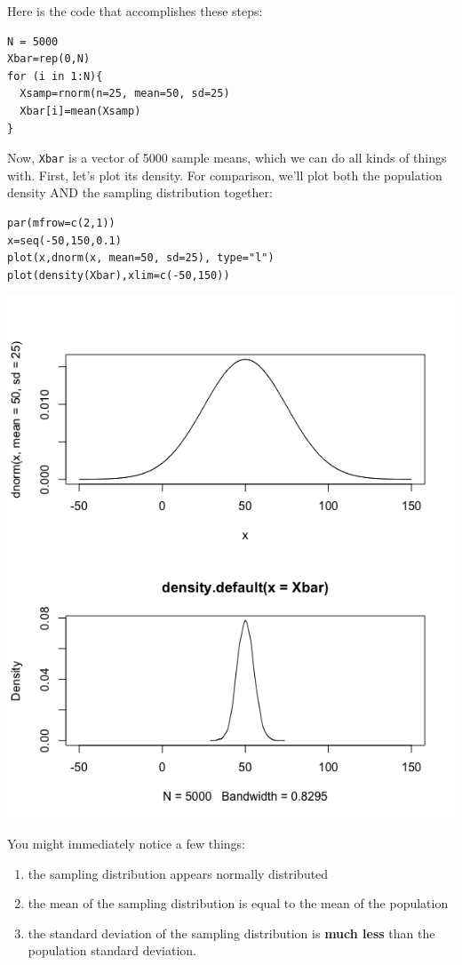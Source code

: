 \documentclass[11pt]{article}
\begin{document}
Here is the code that accomplishes these steps:

\begin{verbatim}
N = 5000
Xbar=rep(0,N)
for (i in 1:N){
  Xsamp=rnorm(n=25, mean=50, sd=25)
  Xbar[i]=mean(Xsamp)
}
\end{verbatim}

Now, \texttt{Xbar} is a vector of 5000 sample means, which we can do all kinds of things with.  First, let's plot its density.  For comparison, we'll plot both the population density AND the sampling distribution together:

\begin{verbatim}
par(mfrow=c(2,1))
x=seq(-50,150,0.1)
plot(x,dnorm(x, mean=50, sd=25), type="l")
plot(density(Xbar),xlim=c(-50,150))
\end{verbatim}

\includegraphics[width=.9\linewidth]{figures/week3/samp.png}

You might immediately notice a few things:
\begin{enumerate}
\item the sampling distribution appears normally distributed
\item the mean of the sampling distribution is equal to the mean of the population
\item the standard deviation of the sampling distribution is \textbf{much less} than the population standard deviation.
\end{enumerate}
\end{document}

